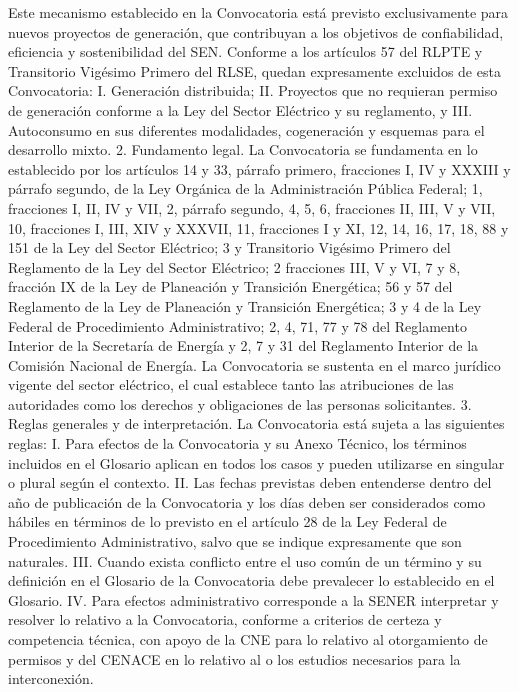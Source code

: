 Este mecanismo establecido en la Convocatoria está previsto exclusivamente para nuevos proyectos de generación, que contribuyan a los objetivos de confiabilidad, eficiencia y sostenibilidad del SEN.
Conforme a los artículos 57 del RLPTE y Transitorio Vigésimo Primero del RLSE, quedan expresamente excluidos de esta Convocatoria:
I. 	Generación distribuida;
II. 	Proyectos que no requieran permiso de generación conforme a la Ley del Sector Eléctrico y su reglamento, y
III. 	Autoconsumo en sus diferentes modalidades, cogeneración y esquemas para el desarrollo mixto.
2. Fundamento legal.
La Convocatoria se fundamenta en lo establecido por los artículos 14 y 33, párrafo primero, fracciones I, IV y XXXIII y párrafo segundo, de la Ley Orgánica de la Administración Pública Federal; 1, fracciones I, II, IV y VII, 2, párrafo segundo, 4, 5, 6, fracciones II, III, V y VII, 10, fracciones I, III, XIV y XXXVII, 11, fracciones I y XI, 12, 14, 16, 17, 18, 88 y 151 de la Ley del Sector Eléctrico; 3 y Transitorio Vigésimo Primero del Reglamento de la Ley del Sector Eléctrico; 2 fracciones III, V y VI, 7 y 8, fracción IX de la Ley de Planeación y Transición Energética; 56 y 57 del Reglamento de la Ley de Planeación y Transición Energética; 3 y 4 de la Ley Federal de Procedimiento Administrativo; 2, 4, 71, 77 y 78 del Reglamento Interior de la Secretaría de Energía y 2, 7 y 31 del Reglamento Interior de la Comisión Nacional de Energía.
La Convocatoria se sustenta en el marco jurídico vigente del sector eléctrico, el cual establece tanto las atribuciones de las autoridades como los derechos y obligaciones de las personas solicitantes.
3. Reglas generales y de interpretación.
La Convocatoria está sujeta a las siguientes reglas:
I.	Para efectos de la Convocatoria y su Anexo Técnico, los términos incluidos en el Glosario aplican en todos los casos y pueden utilizarse en singular o plural según el contexto.
II.	Las fechas previstas deben entenderse dentro del año de publicación de la Convocatoria y los días deben ser considerados como hábiles en términos de lo previsto en el artículo 28 de la Ley Federal de Procedimiento Administrativo, salvo que se indique expresamente que son naturales.
III.	Cuando exista conflicto entre el uso común de un término y su definición en el Glosario de la Convocatoria debe prevalecer lo establecido en el Glosario.
IV.	Para efectos administrativo corresponde a la SENER interpretar y resolver lo relativo a la Convocatoria, conforme a criterios de certeza y competencia técnica, con apoyo de la CNE para lo relativo al otorgamiento de permisos y del CENACE en lo relativo al o los estudios necesarios para la interconexión.
